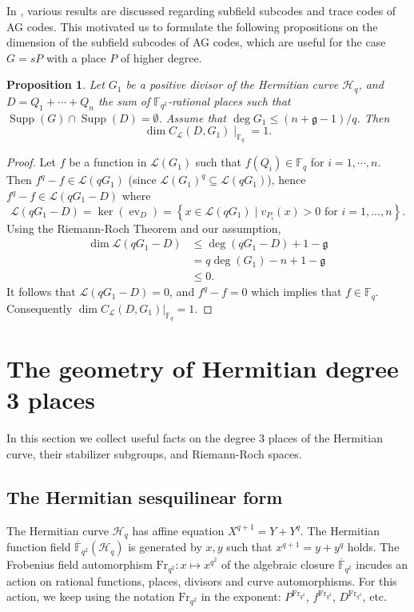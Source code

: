 \documentclass[11pt]{amsart}
\theoremstyle{plain}
\newtheorem{proposition}[theorem]{Proposition}
\theoremstyle{definition}
\theoremstyle{remark}
\newcommand{\Frob}{{\mathrm{Fr}_{q^2}}}
\newcommand{\g}{\mathfrak{g}}
\newcommand{\Supp}{\operatorname{Supp}}
\begin{document}
In \cite[Chapter~9]{stichtenoth2009algebraic}, various results are discussed regarding subfield subcodes and trace codes of AG codes. This motivated us to formulate the following propositions on the  dimension of the subfield subcodes of AG codes, which are useful for the case $G=sP$ with a place $P$ of higher degree.


\begin{proposition} \label{prop:sub}
	Let $G_1$ be a positive divisor of the Hermitian curve $\mathscr{H}_q$, and $D=Q_1+\cdots+Q_n$ the sum of $\mathbb{F}_{q^2}$-rational places such that $\Supp(G)\cap \Supp(D)=\emptyset$. Assume that $\deg G_1 \leq (n+\g-1)/q$. Then 
	\[
	\dim C_{\mathcal{L}}(D,G_1) \mid_{\mathbb{F}_q} = 1.
	\]
\end{proposition}
\begin{proof}
	Let $f$ be a function in $\mathscr{L}(G_1)$ such that $f(Q_i) \in \mathbb{F}_q$ for $i=1,\cdots,n$. Then $f^q -f \in \mathscr{L}(qG_1)$ (since $\mathscr{L}(G_1)^q \subseteq \mathscr{L}(qG_1)$), hence $f^q - f \in  \mathscr{L}(qG_1-D)$ where
	\[\mathscr{L}(qG_1-D) = \ker \left(\operatorname{ev}_{D}\right)=\left\{x \in \mathscr{L}(qG_1) \mid v_{P_i}(x)>0 \text { for } i=1, \ldots, n\right\} .\]
	Using the Riemann-Roch Theorem and our assumption,
	\begin{align*}
	\dim \mathscr{L}(qG_1-D) &\leq \deg(qG_1-D)+1-\g \\
	&= q \deg(G_1) -n +1 -\g \\
	&\leq 0.
	\end{align*}
	It follows that $\mathscr{L}(qG_1 - D)=0$, and  $f^q -f =0$ which implies that $f \in \mathbb{F}_q$. Consequently $\dim C_{\mathcal{L}}(D,G_1)|_{ \mathbb{F}_q}= 1$.

\end{proof}






\section{The geometry of Hermitian degree 3 places} \label{sec:geometry}

In this section we collect useful facts on the degree 3 places of the Hermitian curve, their stabilizer subgroups, and Riemann-Roch spaces. 

\subsection{The Hermitian sesquilinear form} \label{ssec:h-form}
The Hermitian curve $\mathscr{H}_q$ has affine equation $X^{q+1}=Y+Y^q$. The Hermitian function field $\overline{\mathbb{F}}_{q^2}(\mathscr{H}_q)$ is generated by $x,y$ such that $x^{q+1}=y+y^q$ holds. The Frobenius field automorphism $\Frob:x\mapsto x^{q^2}$ of the algebraic closure $\overline{\mathbb{F}}_{q^2}$ incudes an action on rational functions, places, divisors and curve automorphisms. For this action, we keep using the notation $\Frob$ in the exponent: $P^\Frob$, $f^\Frob$, $D^\Frob$, etc. 
\end{document}
